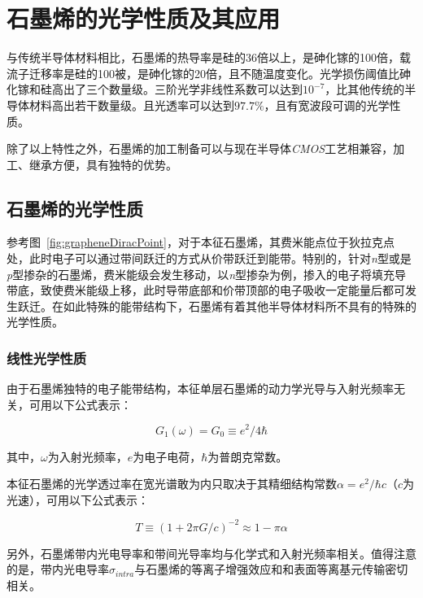 
\chapter{石墨烯的光学性质及其应用}

与传统半导体材料相比，石墨烯的热导率是硅的36倍以上，是砷化镓的100倍，载流子迁移率是硅的100被，是砷化镓的20倍，且不随温度变化。光学损伤阈值比砷化镓和硅高出了三个数量级。三阶光学非线性系数可以达到$10^{-7}$，比其他传统的半导体材料高出若干数量级。且光透率可以达到$97.7\%$，且有宽波段可调的光学性质。

除了以上特性之外，石墨烯的加工制备可以与现在半导体\textit{CMOS}工艺相兼容，加工、继承方便，具有独特的优势。

\section{石墨烯的光学性质}

参考图~\ref{fig:grapheneDiracPoint}，对于本征石墨烯，其费米能点位于狄拉克点处，此时电子可以通过带间跃迁的方式从价带跃迁到能带。特别的，针对\textit{n}型或是\textit{p}型掺杂的石墨烯，费米能级会发生移动，以\textit{n}型掺杂为例，掺入的电子将填充导带底，致使费米能级上移，此时导带底部和价带顶部的电子吸收一定能量后都可发生跃迁。在如此特殊的能带结构下，石墨烯有着其他半导体材料所不具有的特殊的光学性质。

\subsection{线性光学性质}

由于石墨烯独特的电子能带结构，本征单层石墨烯的动力学光导与入射光频率无关，可用以下公式表示：

\begin{equation}
    G_1(\omega) = G_0 \equiv e^2/4\hbar
\end{equation}

其中，$\omega$为入射光频率，$e$为电子电荷，$\hbar$为普朗克常数。

本征石墨烯的光学透过率在宽光谱敢为内只取决于其精细结构常数$\alpha = e^2/\hbar c$（$c$为光速），可用以下公式表示：

\begin{equation}
    T \equiv (1+2\pi G/c)^{-2} \approx 1-\pi \alpha
\end{equation}

另外，石墨烯带内光电导率和带间光导率均与化学式和入射光频率相关。值得注意的是，带内光电导率$\sigma_{intra}$与石墨烯的等离子增强效应和和表面等离基元传输密切相关。

